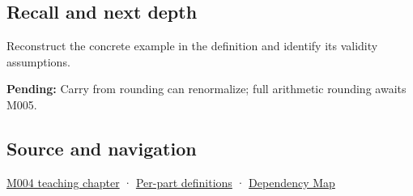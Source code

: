 \subsection{Recall and next depth}\label{appendix-614afe1de592-recall-and-next-depth}

Reconstruct the concrete example in the definition and identify its validity assumptions.

\textbf{Pending:} Carry from rounding can renormalize; full arithmetic rounding awaits M005.

\subsection{Source and navigation}\label{appendix-614afe1de592-source-and-navigation}

\hyperref[01-foundations-i-ch001-a-stretching-ruler-for-real-valued-quantities]{M004 teaching chapter} · \hyperref[appendix-fd090d982a15-m004---parts-61-76]{Per-part definitions} · \hyperref[appendix-4ad47bdd269a]{Dependency Map}
